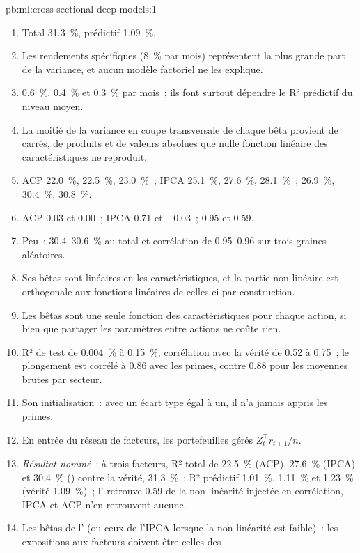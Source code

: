 \begin{solution}{pb:ml:cross-sectional-deep-models:1}
\begin{enumerate}
\item Total 31.3~\%, prédictif 1.09~\%.
\item Les rendements spécifiques (8~\% par mois) représentent la plus grande part de la variance, et aucun modèle factoriel ne les explique.
\item 0.6~\%, 0.4~\% et 0.3~\% par mois~; ils font surtout dépendre le R² prédictif du niveau moyen.
\item La moitié de la variance en coupe transversale de chaque bêta provient de carrés, de produits et de valeurs absolues que nulle fonction linéaire
des caractéristiques ne reproduit.
\item ACP 22.0~\%, 22.5~\%, 23.0~\%~; IPCA 25.1~\%, 27.6~\%, 28.1~\%~;  26.9~\%, 30.4~\%, 30.8~\%.
\item ACP 0.03 et 0.00~; IPCA 0.71 et $-0.03$~;  0.95 et 0.59.
\item Peu~: 30.4--30.6~\% au total et corrélation de 0.95--0.96 sur trois graines aléatoires.
\item Ses bêtas sont linéaires en les caractéristiques, et la partie non linéaire est orthogonale aux fonctions linéaires de celles-ci par
construction.
\item Les bêtas sont une seule fonction des caractéristiques pour chaque action, si bien que partager les paramètres entre actions ne coûte rien.
\item R² de test de 0.004~\% à 0.15~\%, corrélation avec la vérité de 0.52 à 0.75~; le plongement est corrélé à 0.86 avec
les primes, contre 0.88 pour les moyennes brutes par secteur.
\item Son initialisation~: avec un écart type égal à un, il n'a jamais appris les primes.
\item En entrée du réseau de facteurs, les portefeuilles gérés $Z_t^\top r_{t+1}/n$.
\item \emph{Résultat nommé}~: à trois facteurs, R² total de 22.5~\% (ACP), 27.6~\% (IPCA) et 30.4~\% () contre la
vérité, 31.3~\%~; R² prédictif 1.01~\%, 1.11~\% et 1.23~\% (vérité 1.09~\%)~; l' retrouve 0.59 de la non-linéarité
injectée en corrélation, IPCA et ACP n'en retrouvent aucune.
\item Les bêtas de l' (ou ceux de l'IPCA lorsque la non-linéarité est faible)~: les expositions aux facteurs doivent être celles des

\end{enumerate}
\end{solution}
